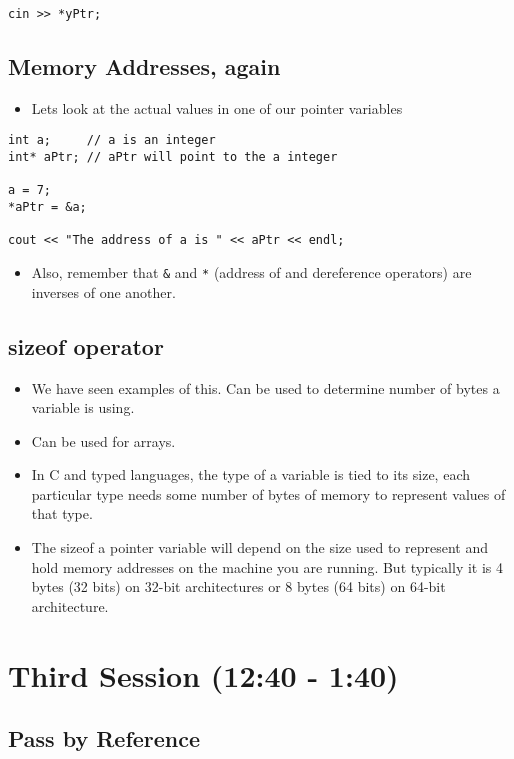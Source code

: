 \documentclass[11pt]{article}
\begin{document}
\begin{verbatim}
cin >> *yPtr;
\end{verbatim}
\subsection{Memory Addresses, again}
\label{sec-2-3}

\begin{itemize}
\item Lets look at the actual values in one of our pointer variables
\end{itemize}

\begin{verbatim}
int a;     // a is an integer
int* aPtr; // aPtr will point to the a integer

a = 7;
*aPtr = &a;

cout << "The address of a is " << aPtr << endl;
\end{verbatim}
\begin{itemize}
\item Also, remember that \verb~&~ and \verb~*~ (address of and dereference operators) are inverses 
  of one another.
\end{itemize}
\subsection{sizeof operator}
\label{sec-2-4}

\begin{itemize}
\item We have seen examples of this.  Can be used to determine number of bytes
  a variable is using.
\item Can be used for arrays.
\item In C and typed languages, the type of a variable is tied to its size, each particular
  type needs some number of bytes of memory to represent values of that type.
\item The sizeof a pointer variable will depend on the size used to represent and hold memory
  addresses on the machine you are running.  But typically it is 4 bytes (32 bits) on
  32-bit architectures or 8 bytes (64 bits) on 64-bit architecture.
\end{itemize}
\section{Third Session (12:40 - 1:40)}
\label{sec-3}
\subsection{Pass by Reference}
\label{sec-3-1}
\end{document}
